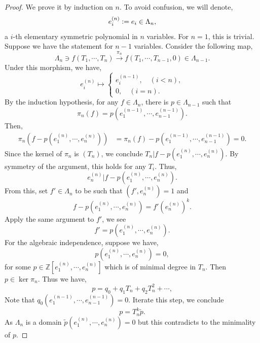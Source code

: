\documentclass{article}
\numberwithin{equation}{theorem}
\newcommand{\defeq}{\vcentcolon=}
\newcommand{\Z}[0]{\mathbb{Z}}
\begin{document}
\begin{proof}
    We prove it by induction on $n$. To avoid confusion, we will denote,
    \begin{equation*}
        e^{(n)}_i \defeq e_i\in\Lambda_n,
    \end{equation*}
    a $i$-th elementary symmetric polynomial in $n$ variables. For $n=1$, this is trivial. Suppose we have the statement for $n-1$ variables. Consider the following map,
    \begin{equation*}
        \Lambda_n\ni f(T_1,\cdots,T_n)\stackrel{\pi_n}{\to}f(T_1,\cdots,T_{n-1},0)\in\Lambda_{n-1}.
    \end{equation*}
    Under this morphism, we have,
    \begin{equation*}
        e_{i}^{(n)}\mapsto \begin{cases}
            e_i^{(n-1)},\quad (i<n),\\
            0,\quad (i=n).
        \end{cases}
    \end{equation*}
    By the induction hypothesis, for any $f\in\Lambda_n$, there is $p\in\Lambda_{n-1}$ such that 
    \begin{equation*}
        \pi_n(f) = p(e_1^{(n-1)},\cdots,e_{n-1}^{(n-1)}).
    \end{equation*}
    Then,
    \begin{align*}
        \pi_n(f-p(e_1^{(n)},\cdots,e_{n}^{(n)})) & = \pi_n(f) - p(e_1^{(n-1)},\cdots,e_{n-1}^{(n-1)}) = 0.
    \end{align*}
    Since the kernel of $\pi_n$ is $(T_n)$, we conclude $T_n|f-p(e_1^{(n)},\cdots,e_n^{(n)})$. By symmetry of the argument, this holds for any $T_i$. Thus,
    \begin{equation*}
        e_n^{(n)}|f-p(e_1^{(n)},\cdots,e_{n}^{(n)}).
    \end{equation*}
    From this, set $f'\in\Lambda_n$ to be such that $(f',e_n^{(n)})=1$ and 
    \begin{equation*}
        f-p(e_1^{(n)},\cdots,e_{n}^{(n)}) = f'(e_n^{(n)})^k.
    \end{equation*}
    Apply the same argument to $f'$, we see 
    \begin{equation*}
        f' = p(e_1^{(n)},\cdots,e_n^{(n)}).
    \end{equation*}
    For the algebraic independence, suppose we have,
    \begin{equation*}
        p(e_1^{(n)},\cdots,e_n^{(n)})=0,
    \end{equation*}
    for some $p\in\Z[e_1^{(n)},\cdots,e_n^{(n)}]$ which is of minimal degree in $T_n$. Then $p\in\ker\pi_n$. Thus we have,
    \begin{equation*}
        p = q_0+q_1T_n+q_2T_n^2+\cdots,
    \end{equation*}
    Note that $q_0(e_1^{(n-1)},\cdots,e_{n-1}^{(n-1)})=0$. Iterate this step, we conclude 
    \begin{equation*}
        p = T_n^k\tilde{p}.
    \end{equation*}
    As $\Lambda_n$ is a domain $\tilde{p}(e_1^{(n)},\cdots,e_n^{(n)})=0$ but this contradicts to the minimality of $p$.
\end{proof}
\end{document}
